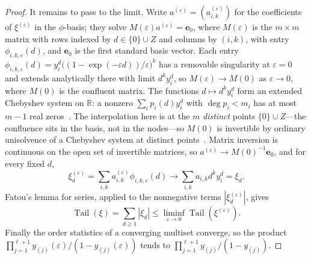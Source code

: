\documentclass[11pt]{article}
\theoremstyle{definition}
\theoremstyle{plain}
\newcommand{\R}{\mathbb R}
\DeclareMathOperator{\Tail}{Tail}
\begin{document}
\begin{proof}
It remains to pass to the limit.  Write
$a^{(\varepsilon)}=(a^{(\varepsilon)}_{i,k})$ for the coefficients of
$\xi^{(\varepsilon)}$ in the $\phi$-basis; they solve
$M(\varepsilon)a^{(\varepsilon)}=\mathbf e_0$, where $M(\varepsilon)$ is the
$m\times m$ matrix with rows indexed by $d\in\{0\}\cup Z$ and columns by
$(i,k)$, with entry $\phi_{i,k,\varepsilon}(d)$, and $\mathbf e_0$ is the first
standard basis vector.  Each entry
$\phi_{i,k,\varepsilon}(d)=y_i^d\bigl((1-\exp(-\varepsilon d))/\varepsilon\bigr)^k$
has a removable singularity at $\varepsilon=0$ and extends analytically there
with limit $d^ky_i^d$, so $M(\varepsilon)\to M(0)$ as $\varepsilon\to0$, where
$M(0)$ is the confluent matrix.  The functions
$d\mapsto d^ky_i^d$ form an extended Chebyshev system on $\R$: a nonzero
$\sum_ip_i(d)y_i^d$ with $\deg p_i<m_i$ has at most $m-1$ real
zeros~\cite[Part~Five, Ch.~1]{polya-szego}.  The
interpolation here is at the $m$ \emph{distinct} points $\{0\}\cup Z$---the
confluence sits in the basis, not in the nodes---so $M(0)$ is invertible by
ordinary unisolvence of a Chebyshev system at distinct
points~\cite[Chapter~I, Theorem~4.1]{karlin-studden}.  Matrix inversion is
continuous on the open set of invertible matrices, so
$a^{(\varepsilon)}\to M(0)^{-1}\mathbf e_0$, and for every fixed $d$,
\[
  \xi^{(\varepsilon)}_d
  =\sum_{i,k}a^{(\varepsilon)}_{i,k}\phi_{i,k,\varepsilon}(d)
  \longrightarrow\sum_{i,k}a_{i,k}d^ky_i^d=\xi_d .
\]
Fatou's lemma for series, applied to the nonnegative terms
$|\xi^{(\varepsilon)}_d|$, gives
\[
  \Tail(\xi)=\sum_{d\ge1}|\xi_d|
  \le\liminf_{\varepsilon\to0}\Tail(\xi^{(\varepsilon)}).
\]
Finally the order statistics of a converging multiset converge, so the
product $\prod_{j=1}^{\ell+1}y_{(j)}(\varepsilon)/(1-y_{(j)}(\varepsilon))$
tends to $\prod_{j=1}^{\ell+1}y_{(j)}/(1-y_{(j)})$.
\end{proof}
\end{document}
